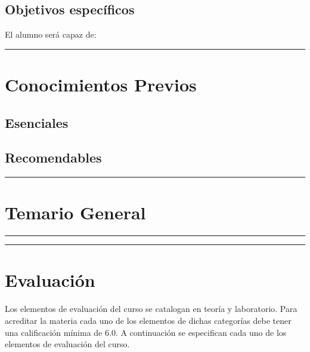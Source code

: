 \documentclass[letterpaper, 11pt]{article}
\begin{document}
\subsection{Objetivos específicos}
El alumno será capaz de:
\objetivos

\vspace* {5pt}
\hrule

\section{Conocimientos Previos}

\subsection{Esenciales}
\crequeridos

\subsection{Recomendables}
\copcionales



\vspace* {5pt}
\hrule




\section{Temario General}


\renewcommand{\labelenumi}{\arabic{enumi}.}
\renewcommand{\labelenumii}{\labelenumi\arabic{enumii}.}
\renewcommand{\labelenumiii}{\labelenumii\arabic{enumiii}. }


\nocite{Kamal2009,Parhami2007}
\printbibliography[title={Bibliografía Básica}, keyword=basica, sorting=tny, heading=bibnumbered]

\nocite{TivaUG2013,Tiva2014}
\printbibliography[title={Bibliografía Básica}, keyword=complementaria, sorting=tny, heading=bibnumbered]

\hrule


\vspace* {3pt}
\hrule
\vspace* {2pt}
\section{Evaluación}

Los elementos de evaluación del curso se catalogan en teoría y laboratorio. Para acreditar la materia cada uno de los elementos de dichas categorías debe tener una calificación mínima de 6.0. A continuación se especifican cada uno de los elementos de evaluación del curso.
\end{document}
